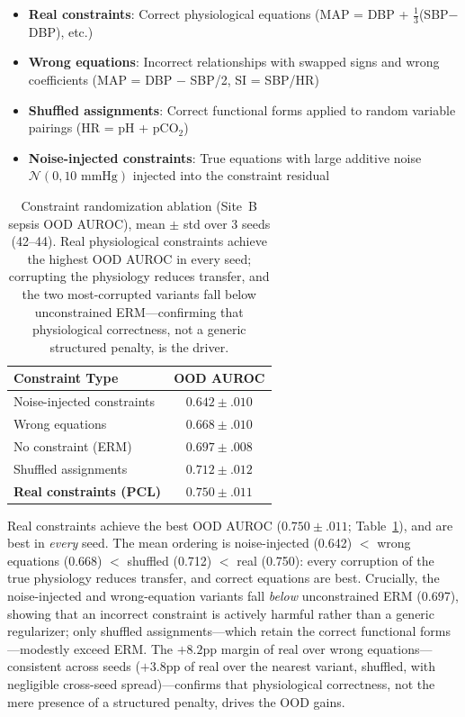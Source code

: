 \documentclass{article}
\begin{document}
\begin{itemize}
    \item \textbf{Real constraints}: Correct physiological equations (MAP = DBP + $\frac{1}{3}$(SBP$-$DBP), etc.)
    \item \textbf{Wrong equations}: Incorrect relationships with swapped signs and wrong coefficients (MAP = DBP $-$ SBP/2, SI = SBP/HR)
    \item \textbf{Shuffled assignments}: Correct functional forms applied to random variable pairings (HR = pH + pCO$_2$)
    \item \textbf{Noise-injected constraints}: True equations with large additive noise $\mathcal{N}(0, 10\text{ mmHg})$ injected into the constraint residual
\end{itemize}

\begin{table}[htbp]
\caption{Constraint randomization ablation (Site~B sepsis OOD AUROC), mean $\pm$ std over 3 seeds (42--44). Real physiological constraints achieve the highest OOD AUROC in every seed; corrupting the physiology reduces transfer, and the two most-corrupted variants fall below unconstrained ERM---confirming that physiological correctness, not a generic structured penalty, is the driver.}
\label{tab:randomization}
\centering
\small
\begin{tabular}{@{}lc@{}}
\toprule
Constraint Type & OOD AUROC \\
\midrule
Noise-injected constraints & $0.642{\pm}.010$ \\
Wrong equations & $0.668{\pm}.010$ \\
No constraint (ERM) & $0.697{\pm}.008$ \\
Shuffled assignments & $0.712{\pm}.012$ \\
\textbf{Real constraints (PCL)} & $\mathbf{0.750{\pm}.011}$ \\
\bottomrule
\end{tabular}
\end{table}

Real constraints achieve the best OOD AUROC ($0.750{\pm}.011$; Table~\ref{tab:randomization}), and are best in \emph{every} seed.
The mean ordering is noise-injected (0.642) $<$ wrong equations (0.668) $<$ shuffled (0.712) $<$ real (0.750): every corruption of the true physiology reduces transfer, and correct equations are best.
Crucially, the noise-injected and wrong-equation variants fall \emph{below} unconstrained ERM (0.697), showing that an incorrect constraint is actively harmful rather than a generic regularizer; only shuffled assignments---which retain the correct functional forms---modestly exceed ERM.
The $+8.2$pp margin of real over wrong equations---consistent across seeds ($+3.8$pp of real over the nearest variant, shuffled, with negligible cross-seed spread)---confirms that physiological correctness, not the mere presence of a structured penalty, drives the OOD gains.
\end{document}
